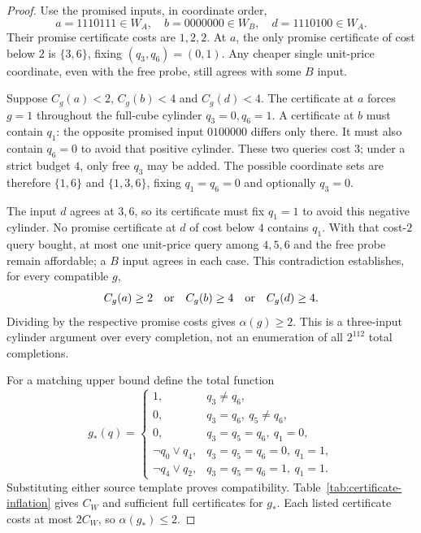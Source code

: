 \documentclass[pdflatex,sn-mathphys-num]{sn-jnl}
\theoremstyle{thmstyleone}
\theoremstyle{thmstylethree}
\theoremstyle{thmstyletwo}
\begin{document}
\begin{proof}
Use the promised inputs, in coordinate order,
\[
 a=1110111\in W_A,\quad b=0000000\in W_B,
 \quad d=1110100\in W_A.
\]
Their promise certificate costs are $1,2,2$. At $a$, the only
promise certificate of cost below $2$ is $\{3,6\}$, fixing
$(q_3,q_6)=(0,1)$. Any cheaper single unit-price coordinate, even
with the free probe, still agrees with some $B$ input.

Suppose $C_g(a)<2$, $C_g(b)<4$ and $C_g(d)<4$. The certificate at
$a$ forces $g=1$ throughout the full-cube cylinder
$q_3=0,q_6=1$. A certificate at $b$ must contain $q_1$: the
opposite promised input $0100000$ differs only there. It must also
contain $q_6=0$ to avoid that positive cylinder. These two queries
cost $3$; under a strict budget $4$, only free $q_3$ may be added.
The possible coordinate sets are therefore $\{1,6\}$ and
$\{1,3,6\}$, fixing $q_1=q_6=0$ and optionally $q_3=0$.

The input $d$ agrees at $3,6$, so its certificate must fix $q_1=1$
to avoid this negative cylinder. No promise certificate at $d$ of
cost below $4$ contains $q_1$. With that cost-$2$ query bought, at
most one unit-price query among $4,5,6$ and the free probe remain
affordable; a $B$ input agrees in each case. This contradiction
establishes, for every compatible $g$,
\[
 C_g(a)\geq2\quad\hbox{or}\quad C_g(b)\geq4
       \quad\hbox{or}\quad C_g(d)\geq4.
\]
Dividing by the respective promise costs gives $\alpha(g)\geq2$.
This is a three-input cylinder argument over every completion,
not an enumeration of all $2^{112}$ total completions.

For a matching upper bound define the total function
\[
 g_*(q)=
 \begin{cases}
  1,&q_3\ne q_6,\\
  0,&q_3=q_6,\ q_5\ne q_6,\\
  0,&q_3=q_5=q_6,\ q_1=0,\\
  \neg q_0\lor q_4,&q_3=q_5=q_6=0,\ q_1=1,\\
  \neg q_4\lor q_2,&q_3=q_5=q_6=1,\ q_1=1.
 \end{cases}
\]
Substituting either source template proves compatibility.
Table~\ref{tab:certificate-inflation} gives $C_W$ and sufficient
full certificates for $g_*$. Each listed certificate costs at most
$2C_W$, so $\alpha(g_*)\leq2$.


\end{proof}
\end{document}
